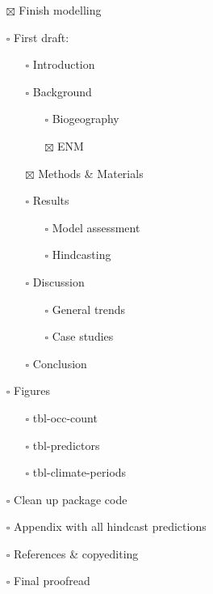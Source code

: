 \documentclass[
  number,
  review]{elsarticle}
\providecommand{\tightlist}{%
  \setlength{\itemsep}{0pt}\setlength{\parskip}{0pt}}\usepackage{longtable,booktabs,array}
\begin{document}
\begin{itemize}
\tightlist
\item[$\boxtimes$]
  Finish modelling
\item[$\square$]
  First draft:

  \begin{itemize}
  \tightlist
  \item[$\square$]
    Introduction
  \item[$\square$]
    Background

    \begin{itemize}
    \tightlist
    \item[$\square$]
      Biogeography
    \item[$\boxtimes$]
      ENM
    \end{itemize}
  \item[$\boxtimes$]
    Methods \& Materials
  \item[$\square$]
    Results

    \begin{itemize}
    \tightlist
    \item[$\square$]
      Model assessment
    \item[$\square$]
      Hindcasting
    \end{itemize}
  \item[$\square$]
    Discussion

    \begin{itemize}
    \tightlist
    \item[$\square$]
      General trends
    \item[$\square$]
      Case studies
    \end{itemize}
  \item[$\square$]
    Conclusion
  \end{itemize}
\item[$\square$]
  Figures

  \begin{itemize}
  \tightlist
  \item[$\square$]
    tbl-occ-count
  \item[$\square$]
    tbl-predictors
  \item[$\square$]
    tbl-climate-periods
  \end{itemize}
\item[$\square$]
  Clean up package code
\item[$\square$]
  Appendix with all hindcast predictions
\item[$\square$]
  References \& copyediting
\item[$\square$]
  Final proofread
\end{itemize}
\end{document}

